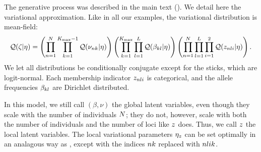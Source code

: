The generative process was described in the main text ().
We detail here the variational approximation.
Like in all our examples, the variational distribution is mean-field:
\begin{align*}
\mathcal{Q}(\zeta \vert \eta) =
    \left(
    \prod_{n=1}^{N}\prod_{k=1}^{{K_{\mathrm{max}}} - 1}
    \mathcal{Q}(\nu_{nk} \vert \eta) \right)
    \left(\prod_{k=1}^{{K_{\mathrm{max}}}}\prod_{l=1}^{L}
    \mathcal{Q}(\beta_{k l} \vert \eta) \right)
    \left( \prod_{n=1}^{N} \prod_{l=1}^{L} \prod_{i=1}^{2} \mathcal{Q}(z_{n l i} \vert \eta) \right).
\end{align*}
We let all distributions be conditionally conjugate except for the sticks,
which are logit-normal.
Each membership indicator $z_{n l i}$ is categorical, and the
allele frequencies $\beta_{k l}$ are Dirichlet distributed.

In this model, we still call $(\beta, \nu)$ the global latent variables, even though they scale
with the number of individuals $N$;
they do not, however, scale with both the number of individuals and the number of loci
like $z$ does. Thus, we call $z$ the local latent variables.
The local variational parameters $\eta_z$ can be set optimally in
an analagous way as , except with the
indices $nk$ replaced with $nlik$.
